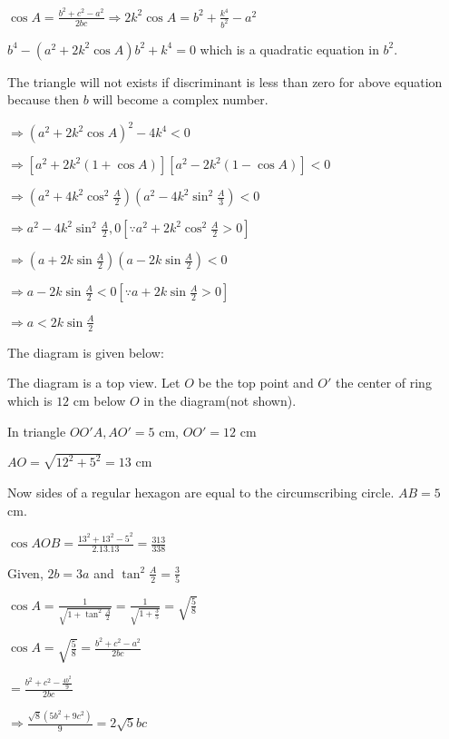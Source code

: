   $\cos A = \frac{b^2 + c^2 - a^2}{2bc} \Rightarrow 2k^2\cos A = b^2 + \frac{k^4}{b^2} - a^2$

  $b^4 - (a^2 + 2k^2\cos A)b^2 + k^4 = 0$ which is a quadratic equation in $b^2.$

  The triangle will not exists if discriminant is less than zero for above equation because then $b$ will become a complex
  number.

  $\Rightarrow (a^2 + 2k^2\cos A)^2 - 4k^4 < 0$

  $\Rightarrow [a^2 + 2k^2(1 + \cos A)][a^2 - 2k^2(1 - \cos A)] < 0$

  $\Rightarrow \left(a^2 + 4k^2\cos^2\frac{A}{2}\right)\left(a^2 - 4k^2\sin^2\frac{A}{3}\right) < 0$

  $\Rightarrow a^2 - 4k^2\sin^2\frac{A}{2} , 0 \left[\because a^2 + 2k^2\cos^2\frac{A}{2} > 0\right]$

  $\Rightarrow \left(a + 2k\sin\frac{A}{2}\right)\left(a - 2k\sin\frac{A}{2}\right) < 0$

  $\Rightarrow a - 2k\sin\frac{A}{2} < 0 \left[\because a + 2k\sin\frac{A}{2} > 0\right]$

  $\Rightarrow a < 2k\sin\frac{A}{2}$

\item The diagram is given below:

  \startplacefigure
    \externalfigure[18_14.pdf]
  \stopplacefigure

  The diagram is a top view. Let $O$ be the top point and $O'$ the center of ring which is $12$ cm below
  $O$ in the diagram(not shown).

  In triangle $OO'A, AO' = 5$ cm, $OO' = 12$ cm

  $AO = \sqrt{12^2 + 5^2} = 13$ cm

  Now sides of a regular hexagon are equal to the circumscribing circle. $AB= 5$ cm.

  $\cos AOB = \frac{13^2 + 13^2 - 5^2}{2.13.13} = \frac{313}{338}$

\item Given, $2b = 3a$ and $\tan^2\frac{A}{2}= \frac{3}{5}$

  $\cos A = \frac{1}{\sqrt{1 + \tan^2\frac{A}{2}}} = \frac{1}{\sqrt{1 + \frac{3}{5}}} = \sqrt{\frac{5}{8}}$

  $\cos A = \sqrt{\frac{5}{8}} = \frac{b^2 + c^2 - a^2}{2bc}$

  $= \frac{b^2 + c^2 - \frac{4b^2}{9}}{2bc}$

  $\Rightarrow \frac{\sqrt{8}(5b^2 + 9c^2)}{9} = 2\sqrt{5}bc$

